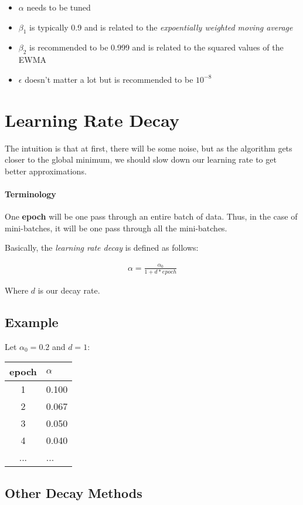 \documentclass{article}
\begin{document}
\begin{itemize}
\item $\alpha$ needs to be tuned
\item $\beta_1$ is typically 0.9 and is related to the \textit{expoentially weighted moving average}
\item $\beta_2$ is recommended to be 0.999 and is related to the squared values of the EWMA
\item $\epsilon$ doesn't matter a lot but is recommended to be $10^{-8}$
\end{itemize}

\section{Learning Rate Decay}

The intuition is that at first, there will be some noise, but as the algorithm gets closer to the global minimum, we should slow down our learning rate to get better approximations.

\paragraph{Terminology}

One \textbf{epoch} will be one pass through an entire batch of data.  Thus, in the case of mini-batches, it will be one pass through all the mini-batches.

Basically, the \textit{learning rate decay} is defined as follows:

\begin{align}
\alpha = \frac{\alpha_0}{1 + d * epoch}
\end{align}

Where $d$ is our decay rate.

\subsection{Example}

Let $\alpha_0 = 0.2$ and $d = 1$:

\begin{tabular}{c | l}
epoch & $\alpha$ \\ \hline
1 & 0.100 \\
2 & 0.067 \\
3 & 0.050 \\
4 & 0.040 \\
... & ...
\end{tabular}

\subsection{Other Decay Methods}
\end{document}
